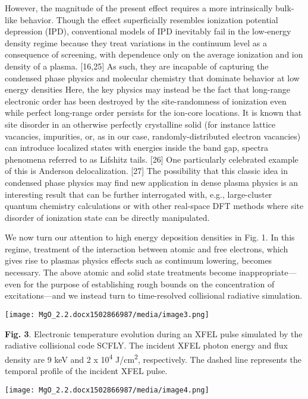 However, the magnitude of the present effect requires a more
intrinsically bulk-like behavior. Though the effect superficially
resembles ionization potential depression (IPD), conventional models of
IPD inevitably fail in the low-energy density regime because they treat
variations in the continuum level as a consequence of screening, with
dependence only on the average ionization and ion density of a plasma.
{[}16,25{]} As such, they are incapable of capturing the condensed phase
physics and molecular chemistry that dominate behavior at low energy
densities Here, the key physics may instead be the fact that long-range
electronic order has been destroyed by the site-randomness of ionization
even while perfect long-range order persists for the ion-core locations.
It is known that site disorder in an otherwise perfectly crystalline
solid (for instance lattice vacancies, impurities, or, as in our case,
randomly-distributed electron vacancies) can introduce localized states
with energies inside the band gap, spectra phenomena referred to as
Lifshitz tails. {[}26{]} One particularly celebrated example of this is
Anderson delocalization. {[}27{]} The possibility that this classic idea
in condensed phase physics may find new application in dense plasma
physics is an interesting result that can be further interrogated with,
e.g., large-cluster quantum chemistry calculations or with other
real-space DFT methods where site disorder of ionization state can be
directly manipulated.

We now turn our attention to high energy deposition densities in Fig. 1.
In this regime, treatment of the interaction between atomic and free
electrons, which gives rise to plasmas physics effects such as continuum
lowering, becomes necessary. The above atomic and solid state treatments
become inappropriate---even for the purpose of establishing rough bounds
on the concentration of excitations---and we instead turn to
time-resolved collisional radiative simulation.

\begin{center}
\texttt{[image: MgO\_2.2.docx1502866987/media/image3.png]}
\end{center}
\textbf{Fig. 3}. Electronic temperature evolution during an XFEL pulse
simulated by the radiative collisional code SCFLY. The incident XFEL
photon energy and flux density are 9 keV and 2 x 10\textsuperscript{4}
J/cm\textsuperscript{2}, respectively. The dashed line represents the
temporal profile of the incident XFEL pulse.

\begin{center}
\texttt{[image: MgO\_2.2.docx1502866987/media/image4.png]}
\end{center}


